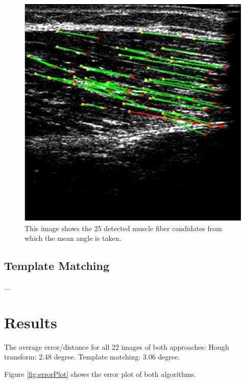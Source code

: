 \documentclass[10pt,twocolumn,letterpaper]{article}
\begin{document}
\begin{figure}
	\begin{center}		
		\includegraphics[width=1\linewidth]{img/im1_hough_fibers}
	\end{center}
	\caption{This image shows the 25 detected muscle fiber candidates from which the mean angle is taken.}
	\label{fig:im1_hough_fibers}
	
\end{figure}

\subsection{Template Matching}
...

\section{Results}
The average error/distance for all 22 images of both approaches: Hough transform: 2.48 degree. Template matching: 3.06 degree.

Figure \ref{fig:errorPlot} shows the error plot of both algorithms.
\end{document}
